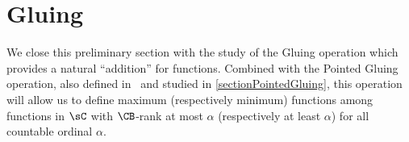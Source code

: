 %
%



\section{Gluing}\label{subsectionGluing}


We close this preliminary section with the study of the Gluing operation which provides a natural \enquote{addition} for functions. Combined with the Pointed Gluing operation, also defined in~\cite{carroy2013quasi} and studied in \cref{sectionPointedGluing}, this operation will allow us to define  maximum (respectively minimum) functions among functions in $\sC$ with $\CB$-rank at most $\alpha$ (respectively at least $\alpha$) for all countable ordinal $\alpha$. %


